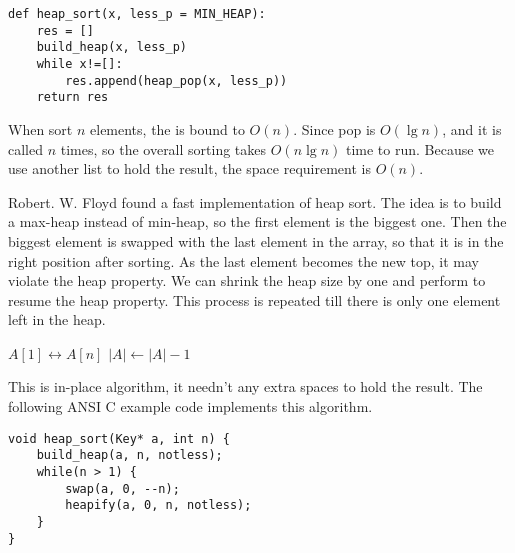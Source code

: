 \documentclass{article}
\begin{document}
\lstset{language=Python}
\begin{lstlisting}
def heap_sort(x, less_p = MIN_HEAP):
    res = []
    build_heap(x, less_p)
    while x!=[]:
        res.append(heap_pop(x, less_p))
    return res
\end{lstlisting}

When sort $n$ elements, the  is bound to $O(n)$.
Since pop is $O(\lg n)$, and it
is called $n$ times, so the overall sorting takes $O(n \lg n)$
time to run. Because we use another list to hold the result,
the space requirement is $O(n)$.

Robert. W. Floyd found a fast implementation of heap sort.
The idea is to build a max-heap instead of min-heap, so the first
element is the biggest one. Then the biggest element is swapped
with the last element in the array, so that it is in the right
position after sorting. As the last element becomes the new top,
it may violate the heap property. We can shrink the heap size
by one and perform
 to resume the heap property.
This process
is repeated till there is only one element left in the heap.

\begin{algorithmic}[1]
  \State {}
    \State {} $A[1] \leftrightarrow A[n]$
    \State $|A| \gets |A| - 1$
    \State {}
  \EndWhile
\EndFunction
\end{algorithmic}

This is in-place algorithm, it needn't any extra spaces to hold
the result. The following ANSI C example code
implements this algorithm.

\lstset{language=C}
\begin{lstlisting}
void heap_sort(Key* a, int n) {
    build_heap(a, n, notless);
    while(n > 1) {
        swap(a, 0, --n);
        heapify(a, 0, n, notless);
    }
}
\end{lstlisting}
\end{document}
